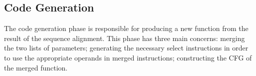



\subsection{Code Generation}

The code generation phase is responsible for producing a new function from the
result of the sequence alignment.
This phase has three main concerns: merging the two lists of parameters;
generating the necessary select instructions in order to
use the appropriate operands in merged instructions;
constructing the CFG of the merged function.

